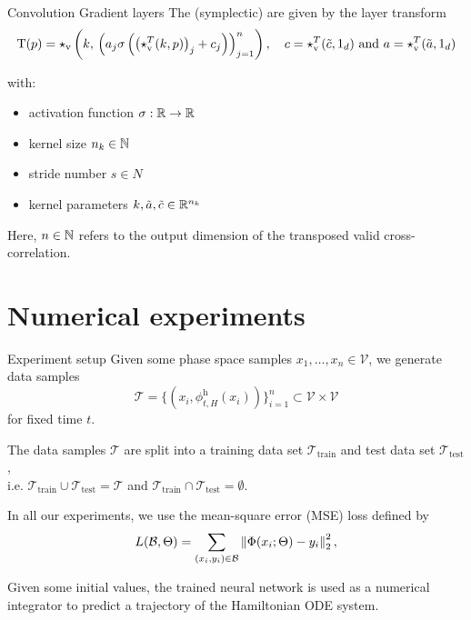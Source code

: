 \begin{frame}[c]{Convolution Gradient layers}
  The (symplectic)  are given by the layer transform
  \begin{equation*}
    \mathrm{T}(p) = \star_{\text{v}} \left( k, \, 
    \left( a_j \sigma \left( \left( \star_{\text{v}}^T(k,p) \right)_j + c_j \right) \right)_{j=1}^n \right),
		\quad c = \star_{\text{v}}^T(\tilde{c},1_d) 
		\text{ and } a = \star_{\text{v}}^T(\tilde{a},1_d)
  \end{equation*}

  with:
  \begin{itemize}
    \item activation function $\sigma : \mathbb{R} \to \mathbb{R}$
    \item kernel size $n_k \in \mathbb{N}$
    \item stride number $s \in N$
    \item kernel parameters $k,\tilde{a},\tilde{c} \in \mathbb{R}^{n_k}$
  \end{itemize}

  Here, $n \in \mathbb{N}$ refers to the output dimension of the
  transposed valid cross-correlation.
\end{frame}

\section{Numerical experiments}

\begin{frame}{Experiment setup}
   {
  Given some phase space samples $x_1, \dots, x_n \in \mathcal{V}$, we generate data samples 
  \begin{equation*}
    \mathcal{T} = \{ (x_i, \phi^{\text{h}}_{t,H}(x_i)) \}_{i=1}^{n}
    \subset \mathcal{V} \times \mathcal{V}
  \end{equation*}
  for fixed time $t$.
  }

   {
  \vspace{0.3cm}
  The data samples $\mathcal{T}$ are split into a training data set 
  $\mathcal{T}_{\text{train}}$ and test data set $\mathcal{T}_{\text{test}}$,\\
  i.e. $\mathcal{T}_{\text{train}} \cup \mathcal{T}_{\text{test}} = \mathcal{T}$
  and $\mathcal{T}_{\text{train}} \cap \mathcal{T}_{\text{test}} = \emptyset$.
  }

   {
  \vspace{0.6cm}
  In all our experiments, we use the mean-square error (MSE) loss defined by
  \begin{equation*}
    L(\mathcal{B}, \Theta) = \sum_{(x_i, y_i) \in \mathcal{B}} \left\lVert{\Phi(x_i; \Theta) - y_i}\right\rVert^2_2
    ,
  \end{equation*}
  }

   {
   Given some initial values,
  the trained neural network is used as a numerical integrator
  to predict a trajectory of the Hamiltonian ODE system.
  }
\end{frame}

